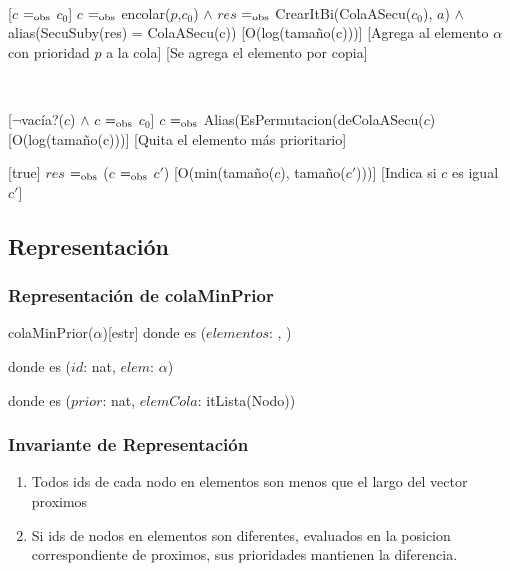 	~

	[$c$ $=_{\mathrm{obs}}$ $c_0$]
	{$c$ $=_{\mathrm{obs}}$ encolar($p$,$c_0$) $\wedge$ $res$ $=_{\mathrm{obs}}$ CrearItBi(ColaASecu($c_0$), $a$) $\wedge$ alias(SecuSuby(res) = ColaASecu(c))}
	[O(log(tamaño(c)))]
	[Agrega al elemento $\alpha$ con prioridad $p$ a la cola]
	[Se agrega el elemento por copia]

	~

	[$\neg$vacía?($c$) $\land$ $c$ $=_{\mathrm{obs}}$ $c_0$]
	{$c$ $=_{\mathrm{obs}}$ Alias(EsPermutacion(deColaASecu($c$)}
	[O(log(tamaño(c)))]
	[Quita el elemento más prioritario]


	[true]
	{$res$ $=_{\mathrm{obs}}$ ($c$ $=_{\mathrm{obs}}$ $c'$)}
	[O(min(tamaño($c$), tamaño($c'$)))]
	[Indica si $c$ es igual $c'$]

\subsection{Representación}

	\subsubsection{Representación de colaMinPrior}

		\begin{Estructura}{colaMinPrior($\alpha$)}[estr]
			\- \- \- \- donde  es ($elementos$: ,
			)
			
			\- \- \- \- donde  es ($id$: nat, $elem$: $\alpha$)
			
			\- \- \- \- donde  es ($prior$: nat, $elemCola$: itLista(Nodo))			
		\end{Estructura}

	\subsubsection{Invariante de Representación}

		\renewcommand{\labelenumi}{(\Roman{enumi})}

		\begin{enumerate}
			\item Todos ids de cada nodo en elementos son menos que el largo del vector proximos 
			\item Si ids de nodos en elementos son diferentes, evaluados en la posicion correspondiente de proximos, sus prioridades mantienen la diferencia.  
		\end{enumerate}

